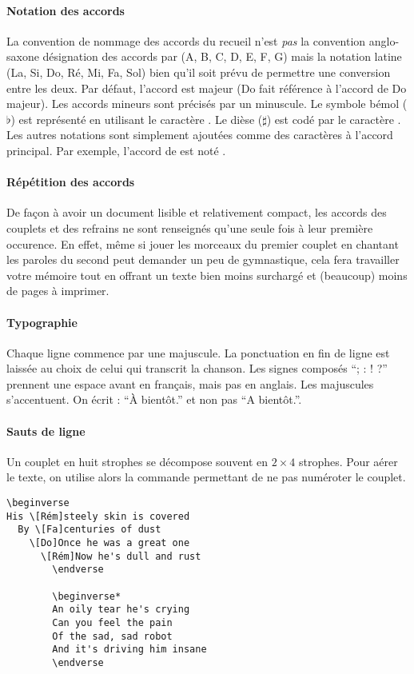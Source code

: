 \documentclass[versionenligne]{patacrep}
\begin{document}
\paragraph{Notation des accords}
La convention de nommage des accords du recueil n'est \emph{pas} la
convention anglo-saxone désignation des accords par (A, B, C, D, E, F,
G) mais la notation latine (La, Si, Do, Ré, Mi, Fa, Sol) bien qu'il
soit prévu de permettre une conversion entre les deux. Par défaut,
l'accord est majeur (Do fait référence à l'accord de Do majeur). Les
accords mineurs sont précisés par un  minuscule.  Le
symbole bémol ($\flat$) est représenté en utilisant le caractère
\command{\&}.  Le dièse ($\sharp$) est codé par le caractère
\command{\#}. Les autres notations sont simplement ajoutées comme des
caractères à l'accord principal. Par exemple, l'accord de  est noté \latexcom{[La\&m]}.

\paragraph{Répétition des accords}
De façon à avoir un document lisible et relativement compact, les
accords des couplets et des refrains ne sont renseignés qu'une seule
fois à leur première occurence. En effet, même si jouer les morceaux
du premier couplet en chantant les paroles du second peut demander un
peu de gymnastique, cela fera travailler votre mémoire tout en offrant
un texte bien moins surchargé et (beaucoup) moins de pages à imprimer.

\paragraph{Typographie}
Chaque ligne commence par une majuscule. La ponctuation en fin de
ligne est laissée au choix de celui qui transcrit la chanson.  Les
signes composés ``; : ! ?'' prennent une espace avant en français,
mais pas en anglais. Les majuscules s'accentuent. On écrit : ``À
bientôt.'' et non pas ``A bientôt.''.

\paragraph{Sauts de ligne}
Un couplet en huit strophes se décompose souvent en $2 \times 4$
strophes. Pour aérer le texte, on utilise alors la commande
 permettant de ne pas numéroter le couplet.

\begin{verbatim}
\beginverse
His \[Rém]steely skin is covered
  By \[Fa]centuries of dust
    \[Do]Once he was a great one
      \[Rém]Now he's dull and rust
        \endverse

        \beginverse*
        An oily tear he's crying
        Can you feel the pain
        Of the sad, sad robot
        And it's driving him insane
        \endverse
\end{verbatim}
\end{document}
